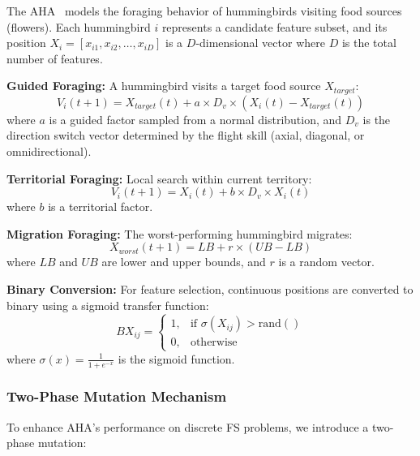 \documentclass[conference,twocolumn]{IEEEtran}
\begin{document}
The AHA~\cite{zhao2022artificial} models the foraging behavior of hummingbirds visiting food sources (flowers). Each hummingbird $i$ represents a candidate feature subset, and its position $X_i = [x_{i1}, x_{i2}, \ldots, x_{iD}]$ is a $D$-dimensional vector where $D$ is the total number of features.

\textbf{Guided Foraging:} A hummingbird visits a target food source $X_{target}$:
\begin{equation}
V_i(t+1) = X_{target}(t) + a \times D_v \times (X_i(t) - X_{target}(t))
\label{eq:guided}
\end{equation}
where $a$ is a guided factor sampled from a normal distribution, and $D_v$ is the direction switch vector determined by the flight skill (axial, diagonal, or omnidirectional).

\textbf{Territorial Foraging:} Local search within current territory:
\begin{equation}
V_i(t+1) = X_i(t) + b \times D_v \times X_i(t)
\label{eq:territorial}
\end{equation}
where $b$ is a territorial factor.

\textbf{Migration Foraging:} The worst-performing hummingbird migrates:
\begin{equation}
X_{worst}(t+1) = LB + r \times (UB - LB)
\label{eq:migration}
\end{equation}
where $LB$ and $UB$ are lower and upper bounds, and $r$ is a random vector.

\textbf{Binary Conversion:} For feature selection, continuous positions are converted to binary using a sigmoid transfer function:
\begin{equation}
BX_{ij} = \begin{cases} 1, & \text{if } \sigma(X_{ij}) > \text{rand}() \\ 0, & \text{otherwise} \end{cases}
\label{eq:binary}
\end{equation}
where $\sigma(x) = \frac{1}{1 + e^{-x}}$ is the sigmoid function.

\subsubsection{Two-Phase Mutation Mechanism}

To enhance AHA's performance on discrete FS problems, we introduce a two-phase mutation:
\end{document}
